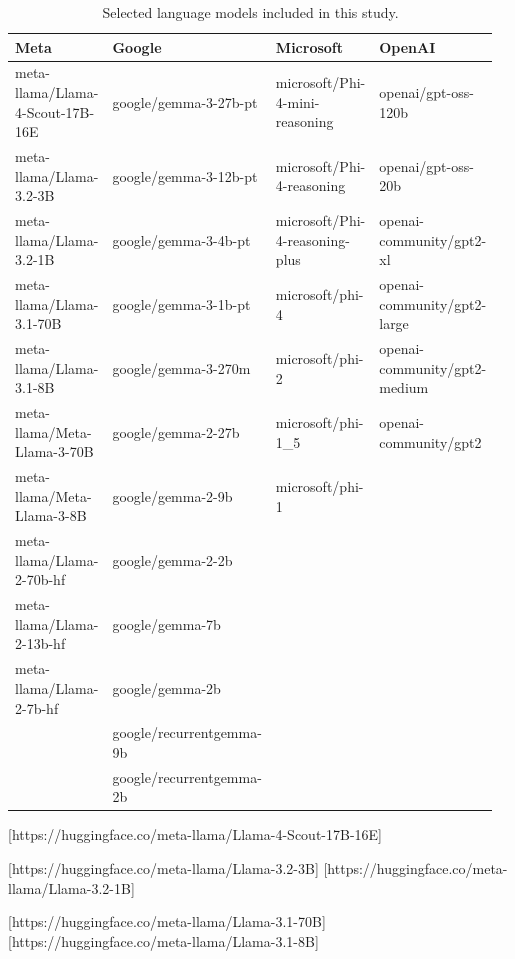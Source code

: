 \begin{enumerate}
        \begin{table}[H]
            \begin{tabular}{p{0.24\linewidth} p{0.24\linewidth} p{0.24\linewidth} p{0.24\linewidth}}
                \hline
                Meta & Google & Microsoft & OpenAI \\
                \hline
                meta-llama/Llama-4-Scout-17B-16E & google/gemma-3-27b-pt & microsoft/Phi-4-mini-reasoning & openai/gpt-oss-120b \\
                meta-llama/Llama-3.2-3B & google/gemma-3-12b-pt & microsoft/Phi-4-reasoning & openai/gpt-oss-20b \\
                meta-llama/Llama-3.2-1B & google/gemma-3-4b-pt & microsoft/Phi-4-reasoning-plus & openai-community/gpt2-xl \\
                meta-llama/Llama-3.1-70B & google/gemma-3-1b-pt & microsoft/phi-4 & openai-community/gpt2-large \\
                meta-llama/Llama-3.1-8B & google/gemma-3-270m & microsoft/phi-2 & openai-community/gpt2-medium \\
                meta-llama/Meta-Llama-3-70B & google/gemma-2-27b & microsoft/phi-1\_5 & openai-community/gpt2 \\
                meta-llama/Meta-Llama-3-8B & google/gemma-2-9b & microsoft/phi-1 & \\
                meta-llama/Llama-2-70b-hf & google/gemma-2-2b &  & \\
                meta-llama/Llama-2-13b-hf & google/gemma-7b &  & \\
                meta-llama/Llama-2-7b-hf & google/gemma-2b &  & \\
                 & google/recurrentgemma-9b &  & \\
                 & google/recurrentgemma-2b &  & \\
                \hline
            \end{tabular}
            \caption{Selected language models included in this study.}
            \label{tab:selected_models}
        \end{table}
    
        [https://huggingface.co/meta-llama/Llama-4-Scout-17B-16E]

        [https://huggingface.co/meta-llama/Llama-3.2-3B]
        [https://huggingface.co/meta-llama/Llama-3.2-1B]

        [https://huggingface.co/meta-llama/Llama-3.1-70B]
        [https://huggingface.co/meta-llama/Llama-3.1-8B]


\end{enumerate}
